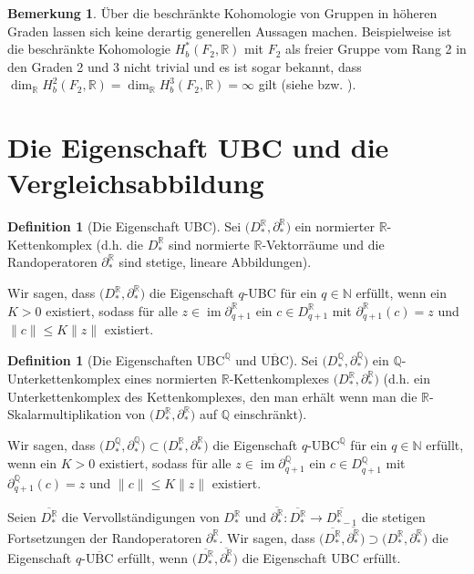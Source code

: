 \documentclass[a4paper,twoside,10pt]{scrreprt}
\DeclareMathOperator{\img}{im}
\newcommand{\N}{\mathbb{N}}
\newcommand{\Q}{\mathbb{Q}}
\newcommand{\R}{\mathbb{R}}
\theoremstyle{definition}
\newtheorem{definition}[satz]{Definition}
\newtheorem{bemerkung}[satz]{Bemerkung}
\begin{document}
\begin{bemerkung}
Über die beschränkte Kohomologie von Gruppen in höheren Graden lassen sich keine derartig generellen Aussagen machen.
Beispielweise ist die beschränkte Kohomologie $H_b^*(F_2,\R)$ mit $F_2$ als freier Gruppe vom Rang 2 in den Graden 2 und 3 nicht trivial und es ist sogar bekannt, dass $\dim_{\R}H_b^2(F_2,\R)=\dim_{\R}H_b^3(F_2,\R)=\infty$ gilt (siehe \cite{mitsumatsu} bzw. \cite{soma}).
\end{bemerkung}

\section{Die Eigenschaft UBC und die Vergleichsabbildung}\label{sec:UBCandComparisonMap}

\begin{definition}[Die Eigenschaft UBC]
Sei $\bigl(D_*^{\R},\partial_*^{\R}\bigr)$ ein normierter $\R$-Kettenkom\-plex (d.h. die $D_*^{\R}$ sind normierte $\R$-Vektorräume und die Randoperatoren $\partial_*^{\R}$ sind stetige, lineare Abbildungen).\par
Wir sagen, dass $\bigl(D_*^{\R},\partial_*^{\R}\bigr)$ die Eigenschaft $q$-UBC für ein $q\in \N$ erfüllt, wenn ein $K>0$ existiert, sodass für alle $z\in \img\partial_{q+1}^{\R}$ ein $c\in D_{q+1}^{\R}$ mit $\partial_{q+1}^{\R}(c)=z$ und $\|c\|\leq K\|z\|$ existiert.
\end{definition}

\begin{definition}[Die Eigenschaften $\text{UBC}^{\Q}$ und $\overline{\text{UBC}}$]\label{def:DefUBCProperty}
Sei $\bigl(D_*^{\Q},\partial_*^{\Q}\bigr)$ ein $\Q$-Unter\-kettenkomplex eines normierten $\R$-Kettenkomplexes $\bigl(D_*^{\R},\partial_*^{\R}\bigr)$ (d.h. ein Unterkettenkomplex des Kettenkomplexes, den man erhält wenn man die $\R$-Skalarmultiplikation  von $\bigl(D_*^{\R},\partial_*^{\R}\bigr)$ auf $\Q$ einschränkt).\par
Wir sagen, dass $\bigl(D_*^{\Q},\partial_*^{\Q}\bigr)\subset \bigl(D_*^{\R},\partial_*^{\R}\bigr)$ die Eigenschaft $q$-$\text{UBC}^{\Q}$ für ein $q\in \N$ erfüllt, wenn ein $K>0$ existiert, sodass für alle $z\in \img\partial_{q+1}^{\Q}$ ein $c\in D_{q+1}^{\Q}$ mit $\partial_{q+1}^{\Q}(c)=z$ und $\|c\|\leq K\|z\|$ existiert.\par
Seien $\overline{D_*^{\R}}$ die Vervollständigungen von $D_*^{\R}$ und $\overline{\partial_*^{\R}}:\overline{D_*^{\R}}\to \overline{D_{*-1}^{\R}}$ die stetigen Fortsetzungen der Randoperatoren $\partial_*^{\R}$. Wir sagen, dass $\bigl(\overline{D_*^{\R}},\overline {\partial_*^{\R}}\bigr)\supset \bigl(D_*^{\R},\partial_*^{\R}\bigr)$ die Eigenschaft $q$-$\overline{\text{UBC}}$ erfüllt, wenn $\bigl(\overline{D_*^{\R}},\overline {\partial_*^{\R}}\bigr)$ die Eigenschaft UBC erfüllt.
\end{definition}
\end{document}
